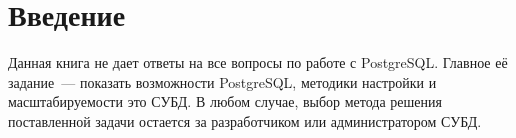 \chapter{Введение}
\begin{epigraphs}
\end{epigraphs}

Данная книга не дает ответы на все вопросы по работе с PostgreSQL. 
Главное её задание~--- показать возможности PostgreSQL, методики 
настройки и масштабируемости это СУБД. 
В любом случае, выбор метода решения поставленной задачи остается за разработчиком или администратором СУБД. 